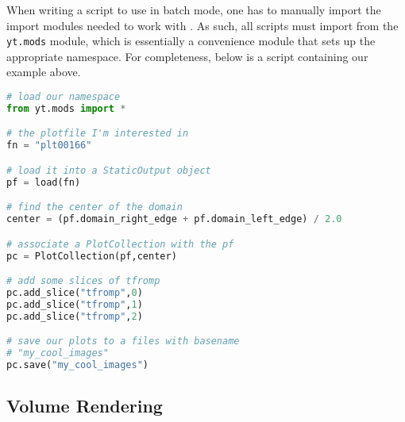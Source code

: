 When writing a script to use in batch mode, one has to manually import
the import modules needed to work with \yt.  As such, all scripts must
import from the {\tt yt.mods} module, which is essentially a
convenience module that sets up the appropriate \yt namespace.  
For completeness, below is a script containing our example above.
\begin{lstlisting}[language=Python]
# load our namespace
from yt.mods import *

# the plotfile I'm interested in
fn = "plt00166"

# load it into a StaticOutput object
pf = load(fn)

# find the center of the domain
center = (pf.domain_right_edge + pf.domain_left_edge) / 2.0

# associate a PlotCollection with the pf
pc = PlotCollection(pf,center)

# add some slices of tfromp
pc.add_slice("tfromp",0)
pc.add_slice("tfromp",1)
pc.add_slice("tfromp",2)

# save our plots to a files with basename
# "my_cool_images"
pc.save("my_cool_images")
\end{lstlisting}

\subsection{Volume Rendering}

